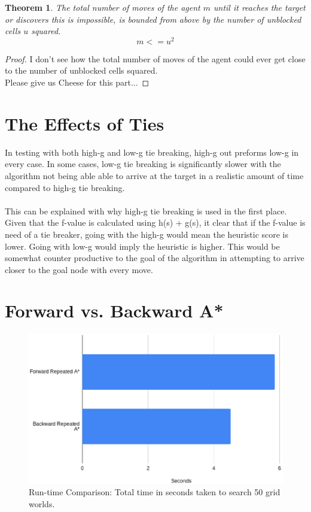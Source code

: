 \documentclass[titlepage]{article}
\newtheorem{theorem}{Theorem}[section]
\begin{document}
    \begin{adjustwidth}{20pt}{20pt}
        \begin{theorem}\label{thm1}
            \emph{The total number of moves of the agent $m$ until it reaches the target or discovers this is impossible, is bounded from above by the number of unblocked cells $u$ squared.}
            \[m <= u^2\]
        \end{theorem}
        
        \begin{proof}
            I don't see how the total number of moves of the agent could ever get close to the number of unblocked cells squared. \\
            Please give us Cheese for this part...
        \end{proof}
    \end{adjustwidth}
    
\section{The Effects of Ties}
In testing with both high-g and low-g tie breaking, high-g out preforms low-g in every case. In some cases, low-g tie breaking is significantly slower with the algorithm not being able able to arrive at the target in a realistic amount of time compared to high-g tie breaking. \\
\\
\noindent This can be explained with why high-g tie breaking is used in the first place. Given that the f-value is calculated using h(s) + g(s), it clear that if the f-value is need of a tie breaker, going with the high-g would mean the heuristic score is lower. Going with low-g would imply the heuristic is higher. This would be somewhat counter productive to the goal of the algorithm in attempting to arrive closer to the goal node with every move.

\break
\section{Forward vs. Backward A*}

    \begin{figure}[h!]
        \centering
        \includegraphics[scale = 0.5, trim = 20mm 10mm 0mm 0mm ]{AstarRuntime.eps} %
        \caption{Run-time Comparison: Total time in seconds taken to search 50 grid worlds.}
        \label{fig:timecomp}
    \end{figure}
    
\end{document}
